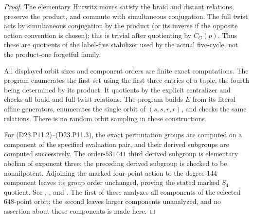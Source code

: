 \begin{proof}
The elementary Hurwitz moves satisfy the braid and distant
relations, preserve the product, and commute with simultaneous
conjugation. The full twist acts by simultaneous conjugation
by the product (or its inverse if the opposite action convention
is chosen); this is trivial after quotienting by $C_G(p)$.
Thus these are quotients of the label-five stabilizer used by
the actual five-cycle, not the product-one forgetful family.

All displayed orbit sizes and component orders are finite exact
computations. The program
enumerates the first set using the first three entries of a tuple,
the fourth being determined by its product. It quotients by the
explicit centralizer and checks all braid and full-twist relations.
The program 
builds $E$ from its literal affine generators, enumerates the
single orbit of $(s,s,r,r)$, and checks the same relations.
There is no random orbit sampling in these constructions.

For (D23.P11.2)--(D23.P11.3), the exact permutation groups are
computed on a component of the specified evaluation pair, and
their derived subgroups are computed successively. The order-$531441$
third derived subgroup is elementary abelian of exponent three;
the preceding derived subgroup is checked to be nonnilpotent.
Adjoining the marked four-point action to the degree-$144$
component leaves its group order unchanged, proving the stated
marked $S_4$ quotient. See
,
, and
.
The first of these analyzes all components of the selected
$648$-point orbit; the second leaves larger components unanalyzed,
and no assertion about those components is made here.
\end{proof}

